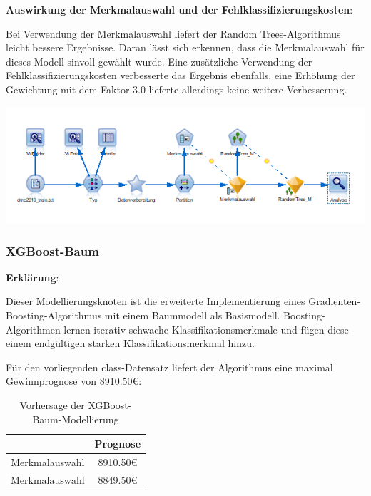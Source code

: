 \documentclass[a4paper,12pt]{article}
\newcounter{Algorithmus}
\begin{document}
{\bf Auswirkung der Merkmalauswahl und der Fehlklassifizierungskosten}:
\par
Bei Verwendung der Merkmalauswahl liefert der Random Trees-Algorithmus leicht bessere Ergebnisse.
Daran lässt sich erkennen, dass die Merkmalauswahl für dieses Modell sinvoll gewählt wurde.
Eine zusätzliche Verwendung der Fehlklassifizierungskosten verbesserte das Ergebnis ebenfalls, eine Erhöhung der Gewichtung mit dem Faktor 3.0 lieferte allerdings keine weitere Verbesserung.

\begin{center}
\includegraphics[width=\textwidth]{Screens/random_trees_m}
\end{center}

\subsubsection{XGBoost-Baum}
{\bf Erklärung}:
\par
\vspace{0.2cm}
Dieser Modellierungsknoten ist die erweiterte Implementierung eines Gradienten-Boosting-Algorithmus mit einem
Baummodell als Basismodell. Boosting-Algorithmen lernen iterativ schwache Klassifikationsmerkmale
und fügen diese einem endgültigen starken Klassifikationsmerkmal hinzu.
\par
\vspace{0.2cm}
Für den vorliegenden class-Datensatz liefert der Algorithmus eine maximal Gewinnprognose von 8910.50\;\euro\;:
\begin{table}[h]
\begin{center}
	\begin{tabular}{c | c}
	 & Prognose
	\\
	\hline
	Merkmalauswahl & 8910.50\;\euro
	\\
	$\overline{\text{Merkmalauswahl}}$ & 8849.50\;\euro
	\end{tabular}
\end{center}
\caption{Vorhersage der XGBoost-Baum-Modellierung}
\end{table}
\end{document}
